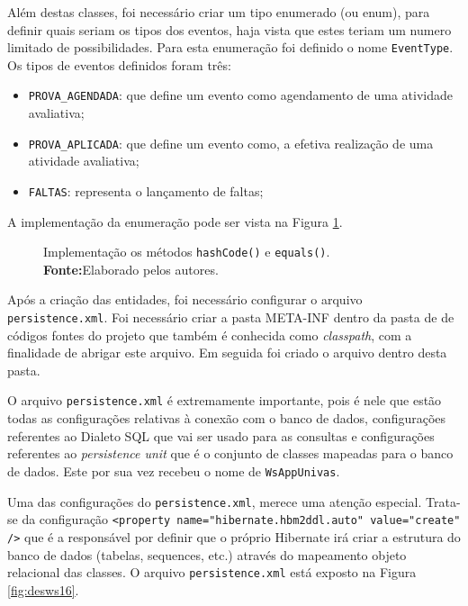 	\pagebreak
	
	
	\par Além destas classes, foi necessário criar um tipo enumerado (ou enum),
para definir quais seriam os tipos dos eventos, haja vista que estes teriam um
numero limitado de possibilidades. Para esta enumeração foi definido o nome
\texttt{EventType}. Os tipos de eventos definidos foram três:

	\begin{itemize}
	  \item \texttt{PROVA\_AGENDADA}: que define um evento como agendamento de uma
	  atividade avaliativa;
	  \item \texttt{PROVA\_APLICADA}: que define um evento como, a efetiva
	  realização de uma atividade avaliativa;
	  \item \texttt{FALTAS}: representa o lançamento de faltas;
	\end{itemize}
	
	\par A implementação da enumeração pode ser vista na Figura \ref{fig:desws15}.

	\begin{figure}[h!]
		
		\caption[Implementação os métodos hashCode() e equals()]{Implementação os
		métodos \texttt{hashCode()} e \texttt{equals()}.
			\textbf{Fonte:}Elaborado pelos autores.}
		\label{fig:desws15}
	\end{figure}

	\par Após a criação das entidades, foi necessário configurar o arquivo
\texttt{persistence.xml}. Foi necessário criar a pasta META-INF dentro da pasta
de de códigos fontes do projeto que também é conhecida como \textit{classpath},
com a finalidade de abrigar este arquivo. Em seguida foi criado o arquivo
dentro desta pasta. 

	\par O arquivo \texttt{persistence.xml} é extremamente importante, pois é nele
que estão todas as configurações relativas à conexão com o banco de dados,
configurações referentes ao Dialeto SQL que vai ser usado para as consultas e
configurações referentes ao \textit{persistence unit} que é o conjunto de
classes mapeadas para o banco de dados. Este por sua vez recebeu o nome de
\texttt{WsAppUnivas}. 
	\par Uma das configurações do \texttt{persistence.xml}, merece uma atenção
especial. Trata-se da configuração \texttt{<property
name="hibernate.hbm2ddl.auto" value="create" />} que é a responsável por
definir que o próprio Hibernate irá criar a estrutura do banco de dados
(tabelas, sequences, etc.) através do mapeamento objeto relacional das classes.
O arquivo \texttt{persistence.xml} está exposto na Figura \ref{fig:desws16}.

